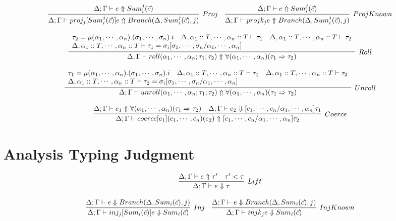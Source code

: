 \documentclass{article}
\begin{document}
$$
\infer[Proj]{\Delta; \Gamma \vdash \Proj{j}{\KSum{i}{\vec c}{j}}{e} \Uparrow Branch(\Delta, \KSum{i}{\vec c}{j}, j)}
{
	\Delta; \Gamma \vdash e \Uparrow \KSum{i}{\vec c}{j}
}
\quad
\infer[ProjKnown]{\Delta; \Gamma \vdash \KProj{j}{e} \Uparrow Branch(\Delta, \KSum{i}{\vec c}{j}, j)}
{
	\Delta; \Gamma \vdash e \Uparrow \KSum{i}{\vec c}{j}
}
$$

$$
\infer[Roll]{\Delta; \Gamma \vdash \Roll{\alpha_1,\cdots,\alpha_n}{\tau_1}{\tau_2} \Uparrow \Coercion{\alpha_1,\cdots,\alpha_n}{\tau_1}{\tau_2}}
{
	\begin{array}{l}
		\tau_2 = \Rec{\alpha_1,\cdots,\alpha_n}{\sigma_1,\cdots,\sigma_n}.i
		\quad \Delta, \alpha_1::T, \cdots, \alpha_n::T \vdash \tau_1
		\quad \Delta, \alpha_1::T, \cdots, \alpha_n::T \vdash \tau_2 \\
		\Delta, \alpha_1::T, \cdots, \alpha_n::T \vdash \tau_1 = \sigma_i[\sigma_1,\cdots,\sigma_n/\alpha_1,\cdots,\alpha_n]
	\end{array}
}
$$

$$
\infer[Unroll]{\Delta; \Gamma \vdash \Unroll{\alpha_1,\cdots,\alpha_n}{\tau_1}{\tau_2} \Uparrow \Coercion{\alpha_1,\cdots,\alpha_n}{\tau_1}{\tau_2}}
{
	\begin{array}{l}
		\tau_1 = \Rec{\alpha_1,\cdots,\alpha_n}{\sigma_1,\cdots,\sigma_n}.i
		\quad \Delta, \alpha_1::T, \cdots, \alpha_n::T \vdash \tau_1
		\quad \Delta, \alpha_1::T, \cdots, \alpha_n::T \vdash \tau_2 \\
		\Delta, \alpha_1::T, \cdots, \alpha_n::T \vdash \tau_2 = \sigma_i[\sigma_1,\cdots,\sigma_n/\alpha_1,\cdots,\alpha_n]
	\end{array}
}
$$

$$
\infer[Coerce]{\Delta; \Gamma \vdash \Coerce{e_1}{c_1,\cdots,c_n}{e_2} \Uparrow [c_1,\cdots,c_n/\alpha_1,\cdots,\alpha_n]\tau_2}
{
	\Delta; \Gamma \vdash e_1 \Uparrow \Coercion{\alpha_1,\cdots,\alpha_n}{\tau_1}{\tau_2}
	\quad \Delta; \Gamma \vdash e_2 \Downarrow [c_1,\cdots,c_n/\alpha_1,\cdots,\alpha_n]\tau_1
}
$$

\section{Analysis Typing Judgment}

$$
\infer[Lift]{\Delta; \Gamma \vdash e \Downarrow \tau}
{
	\Delta; \Gamma \vdash e \Uparrow \tau'
	\quad \tau' < \tau
}
$$

$$
\infer[Inj]{\Delta; \Gamma \vdash \Inj{j}{\Sum{i}{\vec c}}{e} \Downarrow \Sum{i}{\vec c}}
{
	\Delta; \Gamma \vdash e \Downarrow Branch(\Delta, \Sum{i}{\vec c}, j)
}
\quad
\infer[InjKnown]{\Delta; \Gamma \vdash \KInj{j}{e} \Downarrow \Sum{i}{\vec c}}
{
	\Delta; \Gamma \vdash e \Downarrow Branch(\Delta, \Sum{i}{\vec c}, j)
}
$$
\end{document}
